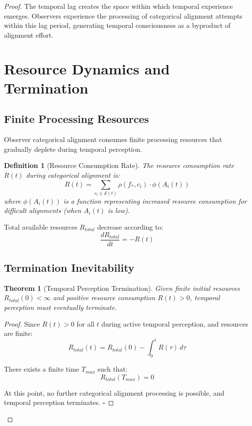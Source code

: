 \documentclass[12pt,a4paper]{article}
\newtheorem{theorem}{Theorem}
\newtheorem{definition}{Definition}
\begin{document}
\begin{proof}
The temporal lag creates the space within which temporal experience emerges. Observers experience the processing of categorical alignment attempts within this lag period, generating temporal consciousness as a byproduct of alignment effort.

\section{Resource Dynamics and Termination}

\subsection{Finite Processing Resources}

Observer categorical alignment consumes finite processing resources that gradually deplete during temporal perception.

\begin{definition}[Resource Consumption Rate]
The resource consumption rate $R(t)$ during categorical alignment is:
$$R(t) = \sum_{c_i \in \mathcal{S}(t)} \rho(f_*, c_i) \cdot \phi(A_i(t))$$
where $\phi(A_i(t))$ is a function representing increased resource consumption for difficult alignments (when $A_i(t)$ is low).
\end{definition}

Total available resources $R_{total}$ decrease according to:
$$\frac{dR_{total}}{dt} = -R(t)$$

\subsection{Termination Inevitability}

\begin{theorem}[Temporal Perception Termination]
Given finite initial resources $R_{total}(0) < \infty$ and positive resource consumption $R(t) > 0$, temporal perception must eventually terminate.
\end{theorem}

\begin{proof}
Since $R(t) > 0$ for all $t$ during active temporal perception, and resources are finite:
$$R_{total}(t) = R_{total}(0) - \int_0^t R(\tau) \, d\tau$$

There exists a finite time $T_{max}$ such that:
$$R_{total}(T_{max}) = 0$$

At this point, no further categorical alignment processing is possible, and temporal perception terminates. $\square$
\end{proof}


\end{proof}
\end{document}

